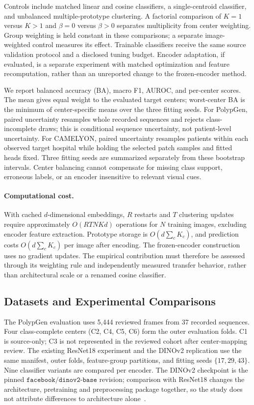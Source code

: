 Controls include matched linear and cosine classifiers, a single-centroid classifier, and unbalanced multiple-prototype clustering. A factorial comparison of $K=1$ versus $K>1$ and $\beta=0$ versus $\beta>0$ separates multiplicity from center weighting. Group weighting is held constant in these comparisons; a separate image-weighted control measures its effect. Trainable classifiers receive the same source validation protocol and a disclosed tuning budget. Encoder adaptation, if evaluated, is a separate experiment with matched optimization and feature recomputation, rather than an unreported change to the frozen-encoder method.

We report balanced accuracy (BA), macro F1, AUROC, and per-center scores. The mean gives equal weight to the evaluated target centers; worst-center BA is the minimum of center-specific means over the three fitting seeds. For PolypGen, paired uncertainty resamples whole recorded sequences and rejects class-incomplete draws; this is conditional sequence uncertainty, not patient-level uncertainty. For CAMELYON, paired uncertainty resamples patients within each observed target hospital while holding the selected patch samples and fitted heads fixed. Three fitting seeds are summarized separately from these bootstrap intervals. Center balancing cannot compensate for missing class support, erroneous labels, or an encoder insensitive to relevant visual cues.

\paragraph{Computational cost.}
With cached $d$-dimensional embeddings, $R$ restarts and $T$ clustering updates require approximately $O(RTNKd)$ operations for $N$ training images, excluding encoder feature extraction. Prototype storage is $O(d\sum_c K_c)$, and prediction costs $O(d\sum_c K_c)$ per image after encoding. The frozen-encoder construction uses no gradient updates. The empirical contribution must therefore be assessed through its weighting rule and independently measured transfer behavior, rather than architectural scale or a renamed cosine classifier.

\subsection{Datasets and Experimental Comparisons}
The PolypGen evaluation uses 5,444 reviewed frames from 37 recorded sequences. Four class-complete centers (C2, C4, C5, C6) form the outer evaluation folds. C1 is source-only; C3 is not represented in the reviewed cohort after center-mapping review. The existing ResNet18 experiment and the DINOv2 replication use the same manifest, outer folds, feature-group partitions, and fitting seeds $\{17,29,43\}$. Nine classifier variants are compared per encoder. The DINOv2 checkpoint is the pinned $\texttt{facebook/dinov2-base}$ revision; comparison with ResNet18 changes the architecture, pretraining and preprocessing package together, so the study does not attribute differences to architecture alone~\cite{he2016deep,oquab2024dinov2}.

